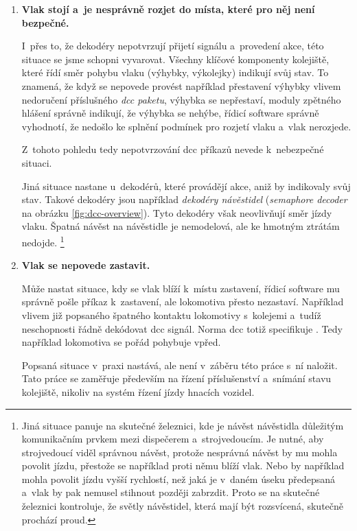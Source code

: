 \begin{enumerate}
\item \textbf{Vlak stojí a~je nesprávně rozjet do místa, které pro něj není
bezpečné.}

	I~přes to, že dekodéry nepotvrzují přijetí signálu a~provedení akce, této
	situace se jsme schopni vyvarovat. Všechny klíčové komponenty kolejiště,
	které řídí směr pohybu vlaku (výhybky, výkolejky) indikují svůj stav. To
	znamená, že když se nepovede provést například přestavení výhybky vlivem
	nedoručení příslušného \textit{\gls{dcc} paketu}, výhybka se nepřestaví,
	moduly zpětného hlášení správně indikují, že výhybka se nehýbe, řídicí
	software správně vyhodnotí, že nedošlo ke splnění podmínek pro rozjetí
	vlaku a~vlak nerozjede.

	Z~tohoto pohledu tedy nepotvrzování \gls{dcc} příkazů nevede k~nebezpečné
	situaci.

	Jiná situace nastane u~dekodérů, které provádějí akce, aniž by indikovaly
	svůj stav. Takové dekodéry jsou například \textit{dekodéry návěstidel}
	(\textit{semaphore decoder} na obrázku \ref{fig:dcc-overview}). Tyto dekodéry
	však neovlivňují směr jízdy vlaku. Špatná návěst na návěstidle je
	nemodelová, ale ke hmotným ztrátám nedojde.
	\footnote{Jiná situace panuje na skutečné železnici, kde je návěst návěstidla
	důležitým komunikačním prvkem mezi dispečerem a~strojvedoucím. Je nutné,
	aby strojvedoucí viděl správnou návěst, protože nesprávná návěst
	by mu mohla povolit jízdu, přestože se například proti němu blíží vlak. Nebo
	by například mohla povolit jízdu vyšší rychlostí, než jaká je v~daném
	úseku předepsaná a~vlak by pak nemusel stihnout později zabrzdit. Proto se
	na skutečné železnici kontroluje, že světly návěstidel, která mají být
	rozsvícená, skutečně prochází proud.}

\item \textbf{Vlak se nepovede zastavit.}

	Může nastat situace, kdy se vlak blíží k~místu zastavení, řídicí software
	mu správně pošle příkaz k~zastavení, ale lokomotiva přesto nezastaví.
	Například vlivem již popsaného špatného kontaktu lokomotivy s~kolejemi
	a~tudíž neschopnosti řádně dekódovat \gls{dcc} signál. Norma \gls{dcc} totiž
	specifikuje .
	Tedy například lokomotiva se pořád pohybuje vpřed.

	Popsaná situace v~praxi nastává, ale není v~záběru této práce s~ní naložit.
	Tato práce se zaměřuje především na řízení příslušenství a~snímání stavu
	kolejiště, nikoliv na systém řízení jízdy hnacích vozidel.

\end{enumerate}

